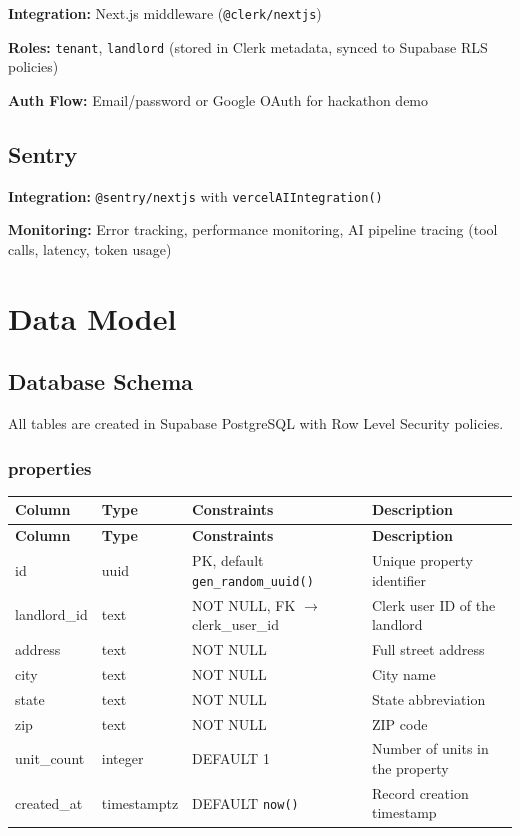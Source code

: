 \documentclass[12pt,a4paper]{article}
\begin{document}
\textbf{Integration:} Next.js middleware (\texttt{@clerk/nextjs})

\textbf{Roles:} \texttt{tenant}, \texttt{landlord} (stored in Clerk metadata, synced to Supabase RLS policies)

\textbf{Auth Flow:} Email/password or Google OAuth for hackathon demo

\subsection{Sentry}

\textbf{Integration:} \texttt{@sentry/nextjs} with \texttt{vercelAIIntegration()}

\textbf{Monitoring:} Error tracking, performance monitoring, AI pipeline tracing (tool calls, latency, token usage)

\section{Data Model}

\subsection{Database Schema}

All tables are created in Supabase PostgreSQL with Row Level Security policies.

\subsubsection{properties}

\begin{longtable}{L{2.5cm} L{2.5cm} L{3.5cm} L{4.5cm}}
\toprule
\textbf{Column} & \textbf{Type} & \textbf{Constraints} & \textbf{Description} \\
\midrule
\endfirsthead
\toprule
\textbf{Column} & \textbf{Type} & \textbf{Constraints} & \textbf{Description} \\
\midrule
\endhead
\bottomrule
\endfoot
id & uuid & PK, default \texttt{gen\_random\_uuid()} & Unique property identifier \\
\midrule
landlord\_id & text & NOT NULL, FK $\rightarrow$ clerk\_user\_id & Clerk user ID of the landlord \\
\midrule
address & text & NOT NULL & Full street address \\
\midrule
city & text & NOT NULL & City name \\
\midrule
state & text & NOT NULL & State abbreviation \\
\midrule
zip & text & NOT NULL & ZIP code \\
\midrule
unit\_count & integer & DEFAULT 1 & Number of units in the property \\
\midrule
created\_at & timestamptz & DEFAULT \texttt{now()} & Record creation timestamp \\
\end{longtable}
\end{document}
